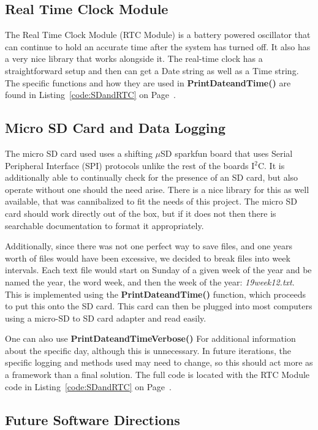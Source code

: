 \documentclass{article}
\begin{document}
\subsection{Real Time Clock Module}
The Real Time Clock Module (RTC Module) is a battery powered oscillator that can continue to hold an accurate time after the system has turned off. It also has a very nice library that works alongside it. The real-time clock has a straightforward setup and then can get a Date string as well as a Time string. The specific functions and how they are used in \textbf{PrintDateandTime()} are found in Listing~\ref{code:SDandRTC} on Page~\pageref{code:SDandRTC}. 

\subsection{Micro SD Card and Data Logging}
The micro SD card used uses a shifting $\mu$SD sparkfun board that uses Serial Peripheral Interface (SPI) protocols unlike the rest of the boards I$^2$C. It is additionally able to continually check for the presence of an SD card, but also operate without one should the need arise. There is a nice library for this as well available, that was cannibalized to fit the needs of this project. The micro SD card should work directly out of the box, but if it does not then there is searchable documentation to format it appropriately. 

Additionally, since there was not one perfect way to save files, and one years worth of files would have been excessive, we decided to break files into week intervals. Each text file would start on Sunday of a given week of the year and be named the year, the word week, and then the week of the year: \textit{19week12.txt}. This is implemented using the \textbf{PrintDateandTime()} function, which proceeds to put this onto the SD card. This card can then be plugged into most computers using a micro-SD to SD card adapter and read easily. 

One can also use \textbf{PrintDateandTimeVerbose()} For additional information about the specific day, although this is unnecessary. In future iterations, the specific logging and methods used may need to change, so this should act more as a framework than a final solution. The full code is located with the RTC Module code in Listing~\ref{code:SDandRTC} on Page~\pageref{code:SDandRTC}.

\subsection{Future Software Directions}
\end{document}
